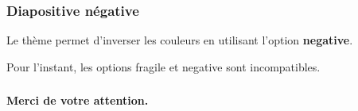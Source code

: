 \documentclass[9pt]{beamer}
\begin{document}
\begin{frame}[negative]
	\frametitle{Diapositive négative}
	Le thème permet d'inverser les couleurs en utilisant l'option \textbf{negative}.

	\alert{Pour l'instant, les options fragile et negative sont incompatibles.}
\end{frame}


\begin{frame}
	\frametitle{}
	\begin{center}
		\textbf{Merci de votre attention.}
	\end{center}
\end{frame}
\end{document}
